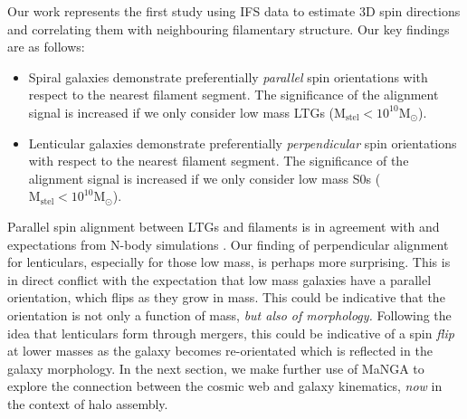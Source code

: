 Our work represents the first study using IFS data to estimate 3D spin directions and correlating them with neighbouring filamentary structure. Our key findings are as follows: 
\begin{itemize}
    \item Spiral galaxies demonstrate preferentially \textit{parallel} spin orientations with respect to the nearest filament segment. The significance of the alignment signal is increased if we only consider low mass LTGs ($\mathrm{M_{stel} < 10^{10} M_{\odot}}$). 
    \item Lenticular galaxies demonstrate preferentially \textit{perpendicular} spin orientations with respect to the nearest filament segment. The significance of the alignment signal is increased if we only consider low mass S0s ($\mathrm{M_{stel} < 10^{10} M_{\odot}}$). 
\end{itemize}

Parallel spin alignment between LTGs and filaments is in agreement with \cite{welker2020} and expectations from N-body simulations \citep[e.g.][]{laigle2015}. Our finding of perpendicular alignment for lenticulars, especially for those low mass, is perhaps more surprising. This is in direct conflict with the expectation that low mass galaxies have a parallel orientation, which flips as they grow in mass. This could be indicative that the orientation is not only a function of mass, \textit{but also of morphology.} Following the idea that lenticulars form through mergers, this could be indicative of a spin \textit{flip} at lower masses as the galaxy becomes re-orientated which is reflected in the galaxy morphology. In the next section, we make further use of MaNGA to explore the connection between the cosmic web and galaxy kinematics, \textit{now} in the context of halo assembly.
